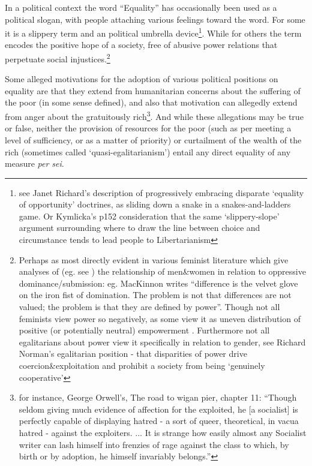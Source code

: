 \documentclass{article}
\begin{document}
In a political context the word ``Equality'' has occasionally been used as a political slogan, with people attaching various feelings toward the word.
For some it is a slippery term and an political umbrella device\footnote{see Janet Richard's description of progressively embracing disparate `equality of opportunity' doctrines, as sliding down a snake in a snakes-and-ladders game. Or Kymlicka's \cite{kymlicka2002contemporary} p152 consideration that the same `slippery-slope' argument surrounding where to draw the line between choice and circumstance tends to lead people to Libertarianism}.
While for others the term encodes the positive hope of a society, free of abusive power relations that perpetuate social injustices.\footnote{Perhaps as most directly evident in various feminist literature which give analyses of (eg. see \cite{Cudd2006-CUDAO}) the relationship of men\&women in relation to oppressive dominance/submission: eg. MacKinnon writes ``difference is the velvet glove on the iron fist of domination. The problem is not that differences are not valued; the problem is that they are defined by power''\cite{mackinnon1989toward}. Though not all feminists view power so negatively, as some view it as uneven distribution of positive (or potentially neutral) empowerment \cite{doi:10.1111/j.1527-2001.1998.tb01350.x}. Furthermore not all egalitarians about power view it specifically in relation to gender, see Richard Norman's egalitarian position - that disparities of power drive coercion\&exploitation and prohibit a society from being `genuinely cooperative'}

Some alleged motivations for the adoption of various political positions on equality are that they extend from humanitarian concerns about the suffering of the poor (in some sense defined), and also that motivation can allegedly extend from anger about the gratuitously rich\footnote{for instance, George Orwell's, The road to wigan pier, chapter 11: ``Though seldom giving much evidence of affection for the exploited, he [a socialist] is perfectly capable of displaying hatred - a sort of queer, theoretical, in vacua hatred - against the exploiters. ... It is strange how easily almost any Socialist writer can lash himself into frenzies of rage against the class to which, by birth or by adoption, he himself invariably belongs.'' }.
And while these allegations may be true or false, neither the provision of resources for the poor (such as per meeting a level of sufficiency, or as a matter of priority) or curtailment of the wealth of the rich (sometimes called `quasi-egalitarianism') entail any direct equality of any measure \textit{per sei}.
\end{document}
